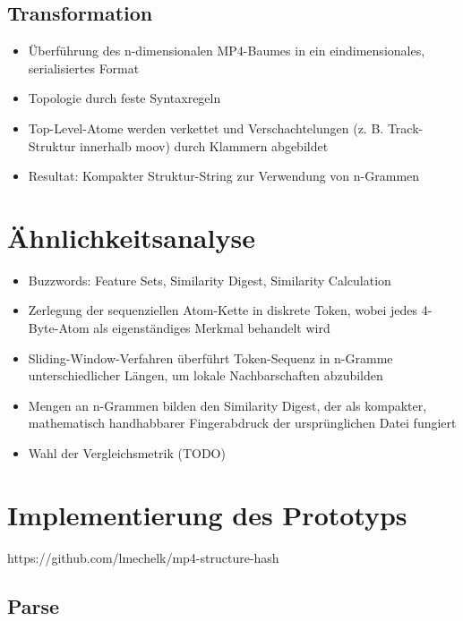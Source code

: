 \subsection{Transformation}

\begin{itemize}
    \item Überführung des n-dimensionalen MP4-Baumes in ein eindimensionales, serialisiertes Format 
    \item Topologie  durch feste Syntaxregeln
    \item Top-Level-Atome werden  verkettet und Verschachtelungen (z. B. Track-Struktur innerhalb moov) durch Klammern abgebildet
    \item Resultat: Kompakter Struktur-String zur Verwendung von n-Grammen
\end{itemize}

\section{Ähnlichkeitsanalyse}

\begin{itemize}
    \item Buzzwords: Feature Sets, Similarity Digest, Similarity Calculation
    \item Zerlegung der sequenziellen Atom-Kette in diskrete Token, wobei jedes 4-Byte-Atom als eigenständiges Merkmal behandelt wird 
    \item Sliding-Window-Verfahren überführt Token-Sequenz in n-Gramme unterschiedlicher Längen, um lokale Nachbarschaften abzubilden
    \item Mengen an n-Grammen bilden den Similarity Digest, der als kompakter, mathematisch handhabbarer Fingerabdruck der ursprünglichen Datei fungiert 
    \item Wahl der Vergleichsmetrik  (TODO)
\end{itemize}






\section{Implementierung des Prototyps}

https://github.com/lmechelk/mp4-structure-hash

\subsection{Parse}

